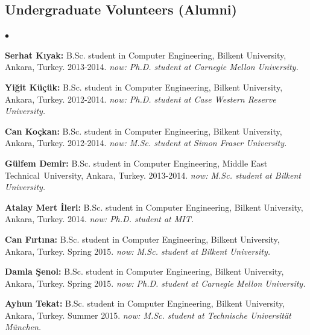 \documentclass[margin,line]{res}
\newenvironment{list2}{
  \begin{list}{$\bullet$}{%
      \setlength{\itemsep}{0in}
      \setlength{\parsep}{0in} \setlength{\parskip}{0in}
      \setlength{\topsep}{0in} \setlength{\partopsep}{0in} 
      \setlength{\leftmargin}{0.2in}}}{\end{list}}
\begin{document}
\begin{resume}
\subsection{\small \sc Undergraduate Volunteers (Alumni)}
\begin{list2}
\item {\bf Serhat Kıyak:} B.Sc. student in Computer Engineering,  Bilkent University, Ankara, Turkey. 2013-2014. {\it now: Ph.D. student at Carnegie Mellon University.}
\item {\bf Yiğit Küçük:} B.Sc. student in Computer Engineering,  Bilkent University, Ankara, Turkey. 2012-2014. {\it now: Ph.D. student at Case Western Reserve University.}
\item {\bf Can Koçkan:} B.Sc. student in Computer Engineering,  Bilkent University, Ankara, Turkey.  2012-2014. {\it now: M.Sc. student at Simon Fraser University.}
\item {\bf Gülfem Demir:} B.Sc. student in Computer Engineering,  Middle East Technical\ University, Ankara, Turkey. 2013-2014. {\it now: M.Sc. student at Bilkent University.}
\item {\bf Atalay Mert İleri:} B.Sc. student in Computer Engineering, Bilkent University, Ankara, Turkey. 2014. {\it now: Ph.D. student at MIT.}
\item {\bf Can Fırtına:} B.Sc. student in Computer Engineering,  Bilkent University, Ankara, Turkey. Spring 2015. {\it now: M.Sc. student at Bilkent University.} 
\item {\bf Damla Şenol:} B.Sc. student in Computer Engineering,  Bilkent University, Ankara, Turkey. Spring 2015. {\it now: Ph.D. student at Carnegie Mellon University.}
\item  {\bf Ayhun Tekat:} B.Sc. student in Computer Engineering,  Bilkent University, Ankara, Turkey. Summer 2015. {\it now: M.Sc. student at Technische Universität München.}
\end{list2}


\vspace*{-.6cm}

\end{resume}
\end{document}
